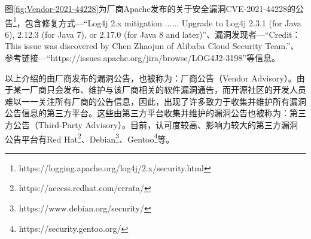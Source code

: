 图\ref{fig:Vendor-2021-44228}为厂商Apache发布的关于安全漏洞CVE-2021-44228的公告\footnote{https://logging.apache.org/log4j/2.x/security.html}，包含修复方式---“Log4j 2.x mitigation ...... Upgrade to Log4j 2.3.1 (for Java 6), 2.12.3 (for Java 7), or 2.17.0 (for Java 8 and later)”、漏洞发现者---“Credit：This issue was discovered by Chen Zhaojun of Alibaba Cloud Security Team.”、参考链接---“https://issues.apache.org/jira/browse/LOG4J2-3198”等信息。


以上介绍的由厂商发布的漏洞公告，也被称为：厂商公告（Vendor Advisory）。由于某一厂商只会发布、维护与该厂商相关的软件漏洞通告，而开源社区的开发人员难以一一关注所有厂商的公告信息，因此，出现了许多致力于收集并维护所有漏洞公告信息的第三方平台。这些由第三方平台收集并维护的漏洞公告也被称为：第三方公告（Third-Party Advisory）。目前，认可度较高、影响力较大的第三方漏洞公告平台有Red Hat\footnote{https://access.redhat.com/errata/}、Debian\footnote{https://www.debian.org/security/}、Gentoo\footnote{https://security.gentoo.org/}等。



